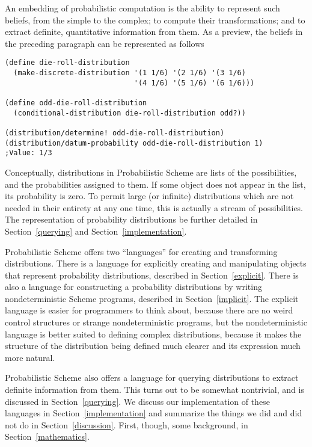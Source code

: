 \documentclass[12pt]{article}
\begin{document}
An embedding of probabilistic computation is the ability to represent
such beliefs, from the simple to the complex; to compute their
transformations; and to extract definite, quantitative information
from them.  As a preview, the beliefs in the preceding paragraph can
be represented as follows
\begin{verbatim}
(define die-roll-distribution
  (make-discrete-distribution '(1 1/6) '(2 1/6) '(3 1/6)
                              '(4 1/6) '(5 1/6) '(6 1/6)))

(define odd-die-roll-distribution
  (conditional-distribution die-roll-distribution odd?))

(distribution/determine! odd-die-roll-distribution)
(distribution/datum-probability odd-die-roll-distribution 1)
;Value: 1/3
\end{verbatim}

Conceptually, distributions in Probabilistic Scheme are lists of the
possibilities, and the probabilities assigned to them.  If some object
does not appear in the list, its probability is zero.  To permit large
(or infinite) distributions which are not needed in their entirety at
any one time, this is actually a stream of possibilities.  The
representation of probability distributions be further detailed in
Section~\ref{querying} and Section~\ref{implementation}.

Probabilistic Scheme offers two ``languages'' for creating and
transforming distributions.  There is a language for explicitly
creating and manipulating objects that represent probability
distributions, described
in Section~\ref{explicit}.  There is also a language for constructing
a probability distributions by writing nondeterministic
Scheme programs, described in Section~\ref{implicit}.
The explicit language is easier for programmers to think about,
because there are no weird control structures or strange
nondeterministic programs, but the nondeterministic language is better suited
to defining complex distributions, because it makes the structure of
the distribution being defined much clearer and its expression much
more natural.

Probabilistic Scheme also offers a language for querying distributions
to extract definite information from them.  This turns out to be
somewhat nontrivial, and is discussed in Section~\ref{querying}.  We
discuss our implementation of these languages in
Section~\ref{implementation} and summarize the things we did and did
not do in Section~\ref{discussion}.  First, though, some background,
in Section~\ref{mathematics}.
\end{document}
